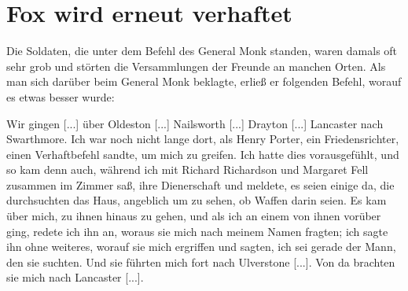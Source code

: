 \section{Fox wird erneut verhaftet}

Die Soldaten, die unter dem Befehl des General 
Monk standen, waren damals oft sehr grob 
und störten die Versammlungen 
der Freunde an manchen Orten. Als man sich darüber
beim General Monk beklagte, erließ er folgenden Befehl, worauf
es etwas besser wurde:



Wir gingen [...] über Oldeston [...]
Nailsworth [...] Drayton [...]
Lancaster nach Swarthmore. 
Ich war noch nicht lange dort, als Henry 
Porter, ein Friedensrichter, einen Verhaftbefehl
sandte, um mich zu greifen. Ich hatte dies vorausgefühlt, und
so kam denn auch, während ich mit Richard 
Richardson und
Margaret Fell zusammen im Zimmer saß, 
ihre Dienerschaft und
meldete, es seien einige da, die durchsuchten das Haus, 
angeblich um zu sehen, ob Waffen darin seien. Es kam über mich, zu
ihnen hinaus zu gehen, und als ich an einem von ihnen vorüber
ging, redete ich ihn an, woraus sie mich nach meinem Namen
fragten; ich sagte ihn ohne weiteres, worauf sie mich ergriffen
und sagten, ich sei gerade der Mann, den sie suchten. Und sie
führten mich fort nach Ulverstone [...]. 
Von da brachten sie mich nach Lancaster [...].


